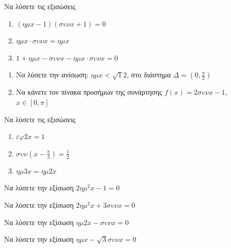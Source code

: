 \documentclass{presentation}
\begin{document}
\begin{askisi}
  Να λύσετε τις εξισώσεις
  \begin{enumerate}
    \item<1-> $(ημx-1)(συνx+1)=0$
    \item<2-> $ημx\cdot συνx=ημx$
    \item<3-> $1+ημx-συνx-ημx\cdot συνx=0$
  \end{enumerate}

\end{askisi}

\begin{askisi}
  \begin{enumerate}
    \item<1-> Να λύσετε την ανίσωση: $ημx<\sqrt{1}{2}$, στο διάστημα $Δ=(0,\frac{π}{2})$
    \item<2-> Να κάνετε τον πίνακα προσήμων της συνάρτησης $f(x)=2συνx-1$, $x\in [0,π]$
  \end{enumerate}

\end{askisi}

\begin{askisi}
  Να λύσετε τις εξισώσεις
  \begin{enumerate}
    \item<1-> $εφ2x=1$
    \item<2-> $συν(x-\frac{π}{3})=\frac{1}{2}$
    \item<3-> $ημ3x=ημ2x$
  \end{enumerate}

\end{askisi}

\begin{askisi}
  Να λύσετε την εξίσωση $2ημ^2x-1=0$

\end{askisi}

\begin{askisi}
  Να λύσετε την εξίσωση $2ημ^2x+3συνx=0$

\end{askisi}

\begin{askisi}
  Να λύσετε την εξίσωση $ημ2x-συνx=0$

\end{askisi}

\begin{askisi}
  Να λύσετε την εξίσωση $ημx-\sqrt{3}συνx=0$

\end{askisi}
\end{document}
